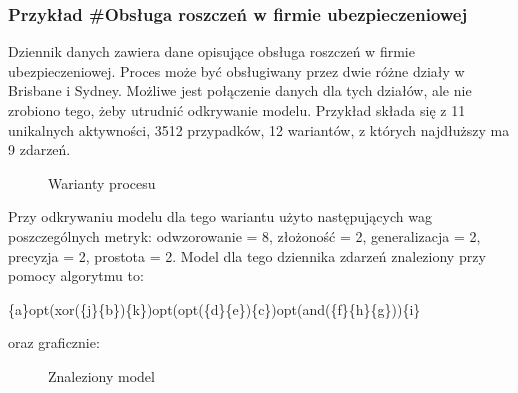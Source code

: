 \subsubsection{Przykład \#Obsługa roszczeń w firmie ubezpieczeniowej}
Dziennik danych zawiera dane opisujące obsługa roszczeń w firmie ubezpieczeniowej. Proces może być obsługiwany przez dwie różne działy w Brisbane i Sydney. Możliwe jest połączenie danych dla tych działów, ale nie zrobiono tego, żeby utrudnić odkrywanie modelu.
Przykład składa się z 11 unikalnych aktywności, 3512 przypadków, 12 wariantów, z których najdłuższy ma 9 zdarzeń. 

\begin{figure}[H]
	\caption{\label{fig:flow_chart}Warianty procesu}
\end{figure}

Przy odkrywaniu modelu dla tego wariantu użyto następujących wag poszczególnych metryk: odwzorowanie = 8, złożoność = 2, generalizacja = 2, precyzja = 2, prostota = 2. Model dla tego dziennika zdarzeń znaleziony przy pomocy algorytmu to:
\begin{center}
	\{a\}opt(xor(\{j\}\{b\})\{k\})opt(opt(\{d\}\{e\})\{c\})opt(and(\{f\}\{h\}\{g\}))\{i\}
\end{center}
oraz graficznie:

\begin{figure}[H]
	\caption{\label{fig:flow_chart}Znaleziony model}
\end{figure}


